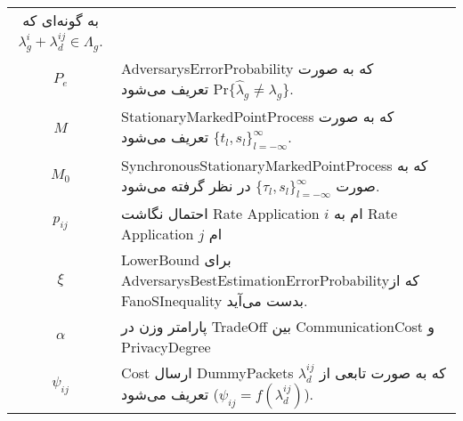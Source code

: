 \begin{table}
\begin{tabular}{cp{12.5cm}}
به گونه‌ای که 
 $\lambda_{g}^{i}+\lambda_{d}^{ij} \in \Lambda_{g}$.\\
$P_{e}$ & \gls*{AdversarysErrorProbability} که به صورت $\mathrm{Pr}\{\hat{\lambda}_{g}\neq \lambda_{g}\}$
تعریف می‌شود.\\
$M$& \gls*{StationaryMarkedPointProcess} که به صورت $\{t_{l},s_{l}\}_{l=-\infty}^{\infty}$
تعریف می‌شود. \\
$M_0$ & \gls*{SynchronousStationaryMarkedPointProcess} که به صورت
$\{\tau_{l},s_{l}\}_{l=-\infty}^{\infty}$
در نظر گرفته می‌شود.\\
$p_{ij}$ &  
احتمال نگاشت 
\gls*{Rate} \gls*{Application} $i$ ام به \gls*{Rate} \gls*{Application} $j$ ام\\
$\xi$ & \gls*{LowerBound} برای \gls*{AdversarysBestEstimationErrorProbability}که از  \gls*{FanoSInequality}
بدست می‌آید.\\
 $\alpha$ &  
پارامتر وزن در 
\gls*{TradeOff} بین \gls*{CommunicationCost} و \gls*{PrivacyDegree}\\
 $\psi_{ij}$ & \gls*{Cost} ارسال \glspl*{DummyPacket}
که به صورت تابعی از 
$\lambda_{d}^{ij}$
تعریف می‌شود
($ \psi_{ij}= f(\lambda_{d}^{ij})$).\\
\bottomrule 
\end{tabular}
\label{tab:symbols}
\end{table}